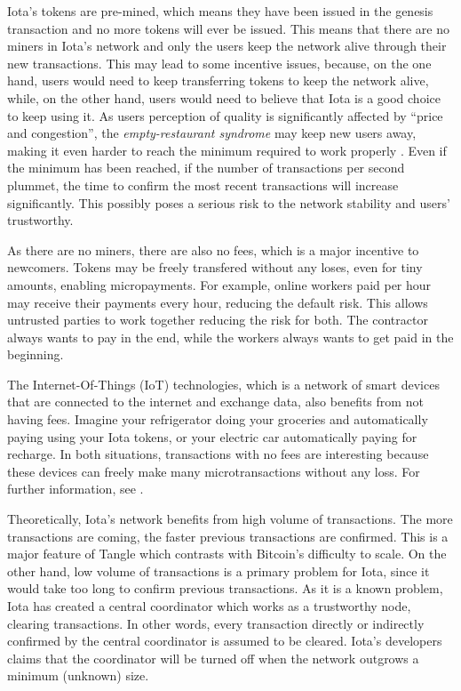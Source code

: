 Iota's tokens are pre-mined, which means they have been issued in the genesis transaction and no more tokens will ever be issued. This means that there are no miners in Iota's network and only the users keep the network alive through their new transactions. This may lead to some incentive issues, because, on the one hand, users would need to keep transferring tokens to keep the network alive, while, on the other hand, users would need to believe that Iota is a good choice to keep using it. As users perception of quality is significantly affected by ``price and congestion'', the \emph{empty-restaurant syndrome} may keep new users away, making it even harder to reach the minimum required to work properly \citep{debo2010prices}. Even if the minimum has been reached, if the number of transactions per second plummet, the time to confirm the most recent transactions will increase significantly. This possibly poses a serious risk to the network stability and users' trustworthy.

As there are no miners, there are also no fees, which is a major incentive to newcomers. Tokens may be freely transfered without any loses, even for tiny amounts, enabling micropayments. For example, online workers paid per hour may receive their payments every hour, reducing the default risk. This allows untrusted parties to work together reducing the risk for both. The contractor always wants to pay in the end, while the workers always wants to get paid in the beginning.

The Internet-Of-Things (IoT) technologies, which is a network of smart devices that are connected to the internet and exchange data, also benefits from not having fees. Imagine your refrigerator doing your groceries and automatically paying using your Iota tokens, or your electric car automatically paying for recharge. In both situations, transactions with no fees are interesting because these devices can freely make many microtransactions without any loss. For further information, see \cite{fleisch2010internet}.

Theoretically, Iota's network benefits from high volume of transactions. The more transactions are coming, the faster previous transactions are confirmed. This is a major feature of Tangle which contrasts with Bitcoin's difficulty to scale. On the other hand, low volume of transactions is a primary problem for Iota, since it would take too long to confirm previous transactions. As it is a known problem, Iota has created a central coordinator which works as a trustworthy node, clearing transactions. In other words, every transaction directly or indirectly confirmed by the central coordinator is assumed to be cleared. Iota's developers claims that the coordinator will be turned off when the network outgrows a minimum (unknown) size.

